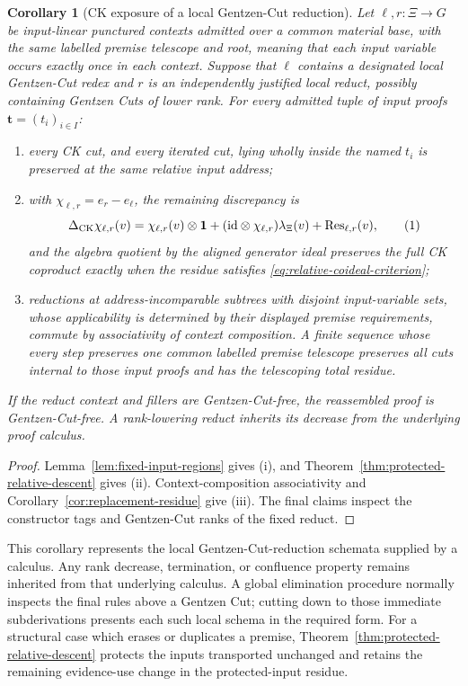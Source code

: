 \documentclass[10pt,a4paper]{article}
\theoremstyle{plain}
\newtheorem{corollary}[theorem]{Corollary}
\theoremstyle{definition}
\theoremstyle{remark}
\newcommand{\DeltaCK}{\Delta_{\mathrm{CK}}}
\newcommand{\one}{\mathbf 1}
\newcommand{\eqtag}{\refstepcounter{equation}\tag{\theequation}}
\begin{document}
\begin{corollary}[CK exposure of a local Gentzen-Cut reduction]
\label{thm:local-cut-reduction}
Let \(\ell,r:\Xi\to G\) be input-linear punctured contexts admitted over
a common material base, with the same labelled premise telescope and root,
meaning that each input variable occurs exactly once in each context.
Suppose that \(\ell\)
contains a designated local Gentzen-Cut redex and \(r\) is an independently
justified local reduct, possibly containing Gentzen Cuts of lower rank.
For every admitted tuple of input proofs \(\mathbf t=(t_i)_{i\in I}\):
\begin{enumerate}[label=(\roman*)]
\item every CK cut, and every iterated cut, lying wholly inside the
named \(t_i\) is preserved at the same relative input address;
\item with \(\chi_{\ell,r}=e_r-e_\ell\), the remaining discrepancy is
\[
 \DeltaCK \chi_{\ell,r}(v)
  =\chi_{\ell,r}(v)\otimes\one
   +(\mathrm{id}\otimes \chi_{\ell,r})\lambda_\Xi(v)
   +\operatorname{Res}_{\ell,r}(v),
\eqtag\label{eq:cut-reduction-decomposition}
\]
and the algebra quotient by the aligned generator ideal preserves the
full CK coproduct exactly when the residue satisfies
\eqref{eq:relative-coideal-criterion};
\item reductions at address-incomparable subtrees with disjoint
input-variable sets, whose applicability is determined by their displayed
premise requirements, commute by associativity of context composition.  A finite
sequence whose every step preserves one common labelled premise telescope
preserves all cuts internal to those input proofs and has the telescoping total
residue.
\end{enumerate}
If the reduct context and fillers are Gentzen-Cut-free, the reassembled
proof is Gentzen-Cut-free.  A rank-lowering reduct inherits its decrease
from the underlying proof calculus.
\end{corollary}

\begin{proof}
Lemma~\ref{lem:fixed-input-regions} gives (i), and
Theorem~\ref{thm:protected-relative-descent} gives (ii).
Context-composition associativity and
Corollary~\ref{cor:replacement-residue} give (iii).  The final
claims inspect the constructor tags and Gentzen-Cut ranks of the fixed reduct.
\end{proof}

This corollary represents the local Gentzen-Cut-reduction schemata supplied by
a calculus.  Any rank decrease, termination, or confluence property remains
inherited from that underlying calculus.  A global elimination procedure normally inspects
the final rules above a Gentzen Cut; cutting down to those immediate
subderivations presents each such local schema in the required form.  For a
structural case which erases or duplicates a premise,
Theorem~\ref{thm:protected-relative-descent} protects the inputs transported
unchanged and retains the remaining evidence-use change in the
protected-input residue.
\end{document}
